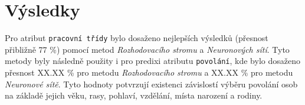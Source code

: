 \documentclass[11pt,a4paper,titlepage]{article}
\begin{document}
    \section{Výsledky}
        Pro atribut \texttt{pracovní třídy} bylo dosaženo nejlepších výsledků (přesnost přibližně 77 \%) pomocí metod \textit{Rozhodovacího stromu} a \textit{Neuronových sítí}. Tyto metody byly následně použity i pro predixi atributu \texttt{povolání}, kde bylo dosaženo přesnost XX.XX \% pro metodu \textit{Rozhodovacího stromu} a XX.XX \% pro metodu \textit{Neuronové sítě}. Tyto hodnoty potvrzují existenci závislostí výběru povolání osob na základě jejich věku, rasy, pohlaví, vzdělání, místa narození a rodiny.
        
    
\end{document}
